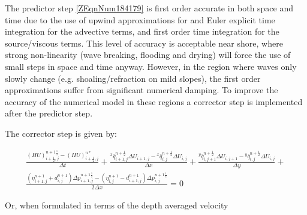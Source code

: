 \documentclass{article}
\begin{document}
\noindent The predictor step \eqref{ZEqnNum184179} is first order accurate in both space and time due to the use of upwind approximations for and Euler explicit time integration for the advective terms, and first order time integration for the source/viscous terms. This level of accuracy is acceptable near shore, where strong non-linearity (wave breaking, flooding and drying) will force the use of small steps in space and time anyway. However, in the region where waves only slowly change (e.g. shoaling/refraction on mild slopes), the first order approximations suffer from significant numerical damping. To improve the accuracy of the numerical model in these regions a corrector step is implemented after the predictor step. 

\noindent 

\noindent The corrector step is given by:

\noindent 
\begin{equation} \label{6.40)} 
\begin{array}{l} {\frac{\left(HU\right)_{i+{\tfrac{1}{2}} ,j}^{n+1{\tfrac{1}{2}} } -\left(HU\right)_{i+{\tfrac{1}{2}} ,j}^{n*} }{\Delta t} +\frac{{}^{x} \bar{q}_{i+1,j}^{n+{\tfrac{1}{2}} } \Delta U_{i+1,j}^{} -{}^{x} \bar{q}_{i,j}^{n+{\tfrac{1}{2}} } \Delta U_{i,j}^{} }{\Delta x} +\frac{{}^{y} \bar{q}_{i,j+1}^{n+{\tfrac{1}{2}} } \Delta U_{i,j+1}^{} -{}^{y} \bar{q}_{i,j}^{n+{\tfrac{1}{2}} } \Delta U_{i,j}^{} }{\Delta y} +} \\ {\frac{\left(\eta _{i+1,j}^{n+1} +d_{i,j}^{n+1} \right)\Delta p_{i+1,j}^{n+1{\tfrac{1}{2}} } -\left(\eta _{i,j}^{n+1} -d_{i+1,j}^{n+1} \right)\Delta p_{i,j}^{n+1{\tfrac{1}{2}} } }{2\Delta x} =0} \end{array} 
\end{equation} 


\noindent Or, when formulated in terms of the depth averaged velocity
\end{document}
